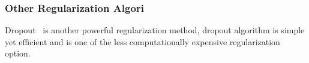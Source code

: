 \subsubsection{Other Regularization Algori}

Dropout~\cite{JMLR:v15:srivastava14a} is another powerful regularization method, dropout algorithm is simple yet efficient and is one of the less computationally expensive regularization option. 